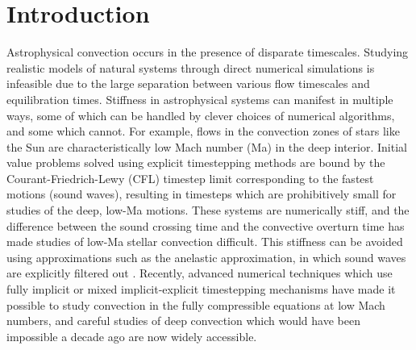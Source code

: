 \documentclass[aps, pre, onecolumn, nofootinbib, notitlepage, groupedaddress, amsfonts, amssymb, amsmath, longbibliography]{revtex4-1}
\begin{document}
\section{Introduction}
\label{sec:intro}
Astrophysical convection occurs in the presence of disparate timescales. 
Studying realistic models of natural systems through direct numerical
simulations is infeasible due to the
large separation between various flow timescales and equilibration times.
Stiffness in astrophysical systems can manifest in multiple ways, some of which can
be handled by clever choices of numerical algorithms, and some which cannot.
For example,
flows in the convection zones of stars like the Sun are characteristically low Mach number
(Ma) in the deep interior. Initial value problems solved using
explicit timestepping methods are bound by the Courant-Friedrich-Lewy
(CFL) timestep limit corresponding to the fastest motions (sound
waves), resulting in timesteps which are prohibitively
small for studies of the deep, low-Ma motions. These systems are numerically
stiff, and the difference between
the sound crossing time and the convective overturn time has made studies of low-Ma stellar
convection difficult. This stiffness can be avoided using approximations such as
the anelastic approximation, in which sound waves are explicitly filtered out
\cite{brown&all2010, featherstone&hindman2016}.
Recently, advanced numerical techniques which use fully implicit 
\cite{viallet&all2011, viallet&all2013, viallet&all2016} or mixed
implicit-explicit \cite{lecoanet&all2014, anders&brown2017, bordwell&all2018} 
timestepping mechanisms have made it possible to study
convection in the fully compressible equations at low Mach numbers, 
and careful studies of deep convection which
would have been impossible a decade ago are now widely accessible.
\end{document}
